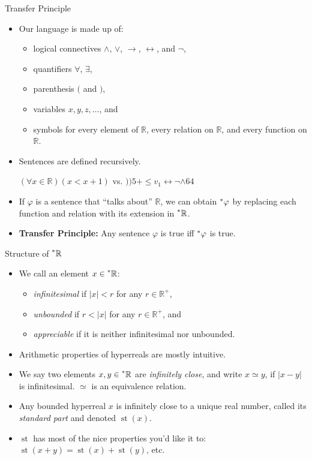 \documentclass{beamer}
\theoremstyle{plain}
\theoremstyle{definition}
\newcommand{\stp}[1]{\st\left(#1\right)}
\newcommand{\reals}{\mathbb{R}}
\newcommand{\hreals}{\prescript{*}{}{\mathbb{R}}}
\newcommand{\hr}[1]{\prescript{*}{}{#1}}
\DeclareMathOperator{\st}{st}
\begin{document}
\begin{frame}{Transfer Principle}
\begin{itemize}
\setlength{\itemsep}{8pt}
\item Our language is made up of:
	\begin{itemize}
	\item logical connectives $\land$, $\lor$, $\to$, $\leftrightarrow$, and $\neg$,
	\item quantifiers $\forall$, $\exists$,
	\item parenthesis $($ and $)$,
	\item variables $x, y, z, \ldots$, and
	\item symbols for every element of $\reals$, every relation on $\reals$, and every function on $\reals$.
	\end{itemize}
\item Sentences are defined recursively. 

$(\forall x \in \reals)(x < x + 1)$ vs. $))5+\leq v_1 \leftrightarrow \neg \land 64$
\item If $\varphi$ is a sentence that ``talks about'' $\reals$, we can obtain $\hr{\varphi}$ by replacing each function and relation with its extension in $\hreals$.
\item \textbf{Transfer Principle:} Any sentence $\varphi$ is true iff $\hr{\varphi}$ is true.
\end{itemize}
\end{frame}

\begin{frame}{Structure of $\hreals$}
\begin{itemize}
\setlength{\itemsep}{10pt}
\item We call an element $x \in \hreals$:
	\begin{itemize}
	\item \textit{infinitesimal} if $|x| < r$ for any $r \in \reals^+$,
	\item \textit{unbounded} if $r < |x|$ for any $r \in \reals^+$, and
	\item \textit{appreciable} if it is neither infinitesimal nor unbounded.
	\end{itemize}
\item Arithmetic properties of hyperreals are mostly intuitive.
\item We say two elements $x, y \in \hreals$ are \textit{infinitely close}, and write $x \simeq y$, if $|x - y|$ is infinitesimal. $\simeq$ is an equivalence relation.
\item Any bounded hyperreal $x$ is infinitely close to a unique real number, called its \textit{standard part} and denoted $\stp{x}$.
\item $\st$ has most of the nice properties you'd like it to: $\stp{x + y} = \stp{x} + \stp{y}$, etc.
\end{itemize}
\end{frame}
\end{document}
